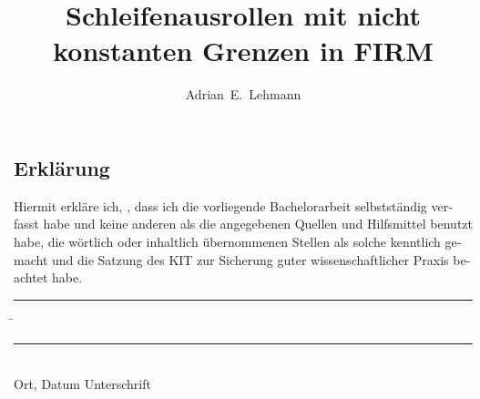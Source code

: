\documentclass[parskip=no,12pt,a4paper,twoside,headings=openright]{scrreprt}
\title{Schleifenausrollen mit nicht konstanten Grenzen in FIRM}
\author{Adrian~E.~Lehmann}
\begin{document}

\begin{otherlanguage}{ngerman} %
\mytitlepage
\end{otherlanguage}



\tableofcontents










\begin{otherlanguage}{ngerman}
\chapter*{Erklärung}
\pagestyle{empty}

  \vspace{20mm}
  Hiermit erkläre ich, \theauthor, dass ich die vorliegende Bachelorarbeit selbst\-ständig
verfasst habe und keine anderen als die angegebenen Quellen und Hilfsmittel
benutzt habe, die wörtlich oder inhaltlich übernommenen Stellen als solche kenntlich gemacht und
die Satzung des KIT zur Sicherung guter wissenschaftlicher Praxis beachtet habe.
  \vspace{20mm}
  \begin{tabbing}
  \rule{4cm}{.4pt}\hspace{1cm} \= \rule{7cm}{.4pt} \\
 Ort, Datum \> Unterschrift
  \end{tabbing}
\end{otherlanguage}


\pagestyle{fancy}
\appendix

%
\end{document}
